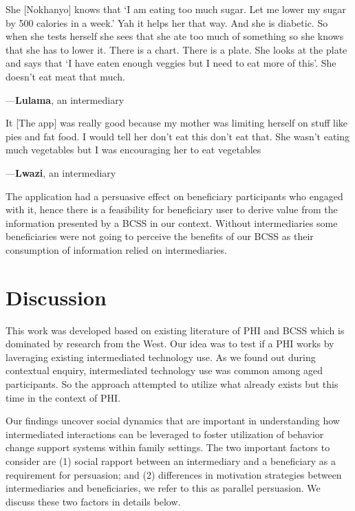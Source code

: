 \documentclass{sig-alternate}
\newenvironment{myquote}
               {\list{}{\rightmargin   \leftmargin
                        \parsep        0in }%
                \item\relax}
               {\endlist}
\newcommand{\userquote}[2]{\begin{samepage}\begin{myquote} 
     \em{\small{#2\begin{flushright}---#1\end{flushright}}}
   \end{myquote}\end{samepage}}
\begin{document}
\userquote{\textbf{Lulama}, an intermediary}{She [Nokhanyo] knows that `I am eating too 
much sugar. Let me lower my sugar by 500 calories in a week.' Yah it 
helps her that way. And she is diabetic. So when she tests herself she 
sees that she ate too much of something so she knows that she has to 
lower it. There is a chart. There is a plate. She looks at the plate and 
says that `I have eaten enough veggies but I need to eat more of this'. 
She doesn't eat meat that much.}

\userquote{\textbf{Lwazi}, an intermediary}
{It [The app] was really good because my 
mother was limiting herself on stuff like pies and fat food. I would tell 
her don't eat this don't eat that. She wasn't eating much vegetables but I 
was encouraging her to eat vegetables}


The application had a persuasive effect on beneficiary participants who
engaged with it, hence there is a feasibility for beneficiary user to derive
value from the information presented by a BCSS in our context. Without intermediaries some beneficiaries were not going to perceive the benefits of our BCSS as their consumption of information relied on intermediaries.  

\section{Discussion}

This work was developed based on existing literature of PHI and BCSS which is
dominated by research from the West. Our idea was to test if a PHI works by
laveraging existing intermediated technology use. As we found out during
contextual enquiry, intermediated technology use was common among aged
participants. So the approach attempted to utilize what already exists but
this time in the context of PHI.

Our findings uncover social dynamics that are important in understanding how
intermediated interactions can be leveraged to foster utilization of behavior
change support systems within family settings. The two important factors to
consider are (1) social rapport between an intermediary and a beneficiary as a
requirement for persuasion; and (2) differences in motivation strategies
between intermediaries and beneficiaries, we refer to this as parallel
persuasion.  We discuss these two factors in details below.
\end{document}
